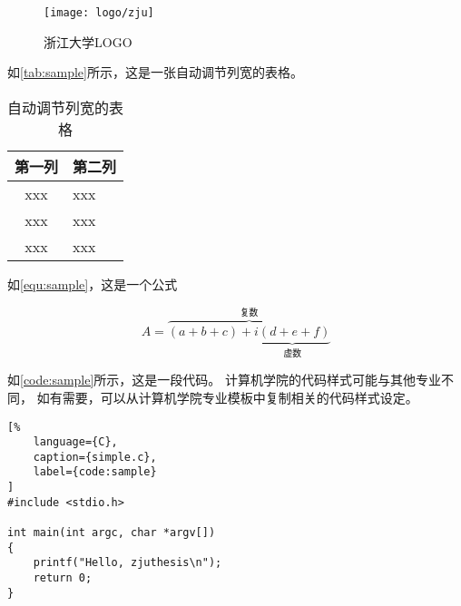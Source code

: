 \begin{figure}[ht]
    \centering
    \texttt{[image: logo/zju]}
    \caption{\label{fig:zju-logo}浙江大学LOGO}
\end{figure}

\par 如\autoref{tab:sample}所示，这是一张自动调节列宽的表格。

\begin{table}[ht]
    \caption{\label{tab:sample}自动调节列宽的表格}
    \begin{tabularx}{\linewidth}{c|X<{\centering}}
        \hline
        第一列 & 第二列 \\ \hline
        xxx & xxx \\ \hline
        xxx & xxx \\ \hline
        xxx & xxx \\ \hline
    \end{tabularx}
\end{table}

\par 如\autoref{equ:sample}，这是一个公式

\begin{equation}
    \label{equ:sample}
    A=\overbrace{(a+b+c)+\underbrace{i(d+e+f)}_{\text{虚数}}}^{\text{复数}}
\end{equation}

\par 如\autoref{code:sample}所示，这是一段代码。
计算机学院的代码样式可能与其他专业不同，
如有需要，可以从计算机学院专业模板中复制相关的代码样式设定。

\begin{lstlisting}[%
    language={C},
    caption={simple.c},
    label={code:sample}
]
#include <stdio.h>

int main(int argc, char *argv[])
{
    printf("Hello, zjuthesis\n");
    return 0;
}
\end{lstlisting}